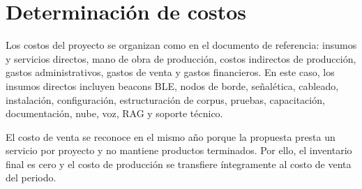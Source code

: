 \section{Determinación de costos}

Los costos del proyecto se organizan como en el documento de referencia: insumos y servicios directos, mano de obra de producción, costos indirectos de producción, gastos administrativos, gastos de venta y gastos financieros. En este caso, los insumos directos incluyen beacons BLE, nodos de borde, señalética, cableado, instalación, configuración, estructuración de corpus, pruebas, capacitación, documentación, nube, voz, RAG y soporte técnico.

El costo de venta se reconoce en el mismo año porque la propuesta presta un servicio por proyecto y no mantiene productos terminados. Por ello, el inventario final es cero y el costo de producción se transfiere íntegramente al costo de venta del periodo.

\begin{table}[H]
	\centering
	\scriptsize
	\mqiTableSetup
	\caption[Costo de producción del proyecto]{Costo de producción transferido al costo de venta. Fuente: hojas \texttt{COSTOS} y \texttt{COSTO DE VENTA}.}
	\label{tab:costos-produccion-proyecto}
\end{table}

